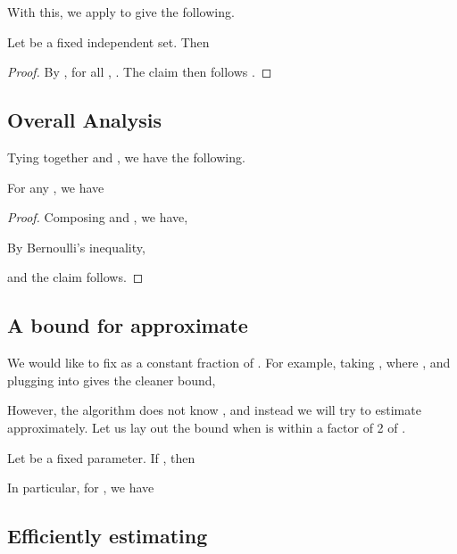 \documentclass[oneside,letterpaper]{scrartcl} \usepackage{macros}
\begin{document}
With this, we apply  to give the following.
\begin{lemma} Let 
  be a fixed independent set. Then
  
\end{lemma}
\begin{proof}
  By , for all ,
  . The claim then
  follows .
\end{proof}

\subsection{Overall Analysis}

Tying together  and
, we have the following.
\begin{lemma} For any , we have
  
\end{lemma}
\begin{proof}
  Composing  and
  , we have,
  
  By Bernoulli's inequality,
  
  and the claim follows.
\end{proof}

\subsection{A bound for approximate }
  We would like to fix  as a constant fraction of . For
example, taking , where ,
and plugging into  gives
the cleaner bound,

However, the algorithm does not know , and instead we will try
to estimate  approximately. Let us lay out the bound when
 is within a factor of 2 of .
\begin{lemma}
  Let  be a fixed parameter.  If , then
  
  In particular, for , we have
  
\end{lemma}

\subsection{Efficiently estimating }
\newcommand{\thresholds}{\mathcal{A}}
\end{document}
